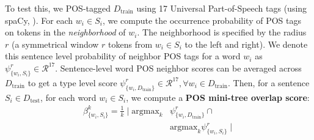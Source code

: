 \documentclass[letterpaper, 12pt]{report}
\begin{document}
To test this, we POS-tagged $D_{\text{train}}$ using 17 Universal Part-of-Speech tags (using spaCy, \citealt{spacy2}). %
For each $w_i \in S_i$, we compute the occurrence probability of POS tags on tokens in the \textit{neighborhood} of $w_i$. The neighborhood is specified by the radius $r$ (a symmetrical window $r$ tokens from $w_i \in S_i$ to the left and right). We denote this sentence level probability of neighbor POS tags for a word $w_i$ as $\psi^r_{\{w_i, S_i\}} \in \mathcal{R}^{17}$. Sentence-level word POS neighbor scores can be averaged across $ D_{\text{train}}$ to get a type level score $\psi^r_{\{w_i, D_{\text{train}}\}} \in \mathcal{R}^{17}, \forall w_i \in D_{\text{train}}$.  Then, for a sentence $S_i \in D_{\text{test}}$, for each word $w_i \in S_i$, we compute a \textbf{POS mini-tree overlap score}:
\begin{equation} %
\begin{split}
\beta^k_{\{w_i,S_i\}} =
\frac{1}{k} \mid \text{argmax}_k &\psi^r_{\{w_i, D_{\text{train}}\}} \cap \\ &\text{argmax}_k\psi^r_{\{w_i, S_i\}} \mid
\end{split}
\end{equation}
\end{document}
